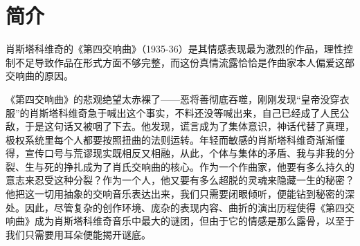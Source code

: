 \documentclass[a4paper,left=2.5cm,right=2.5cm,11pt]{article}
\begin{document}
\tableofcontents

\clearpage

\section{简介}
	肖斯塔科维奇的《第四交响曲》（1935-36）是其情感表现最为激烈的作品，理性控制不足导致作品在形式方面不够完整，而这份真情流露恰恰是作曲家本人偏爱这部交响曲的原因。\par

	《第四交响曲》的悲观绝望太赤裸了——恶将善彻底吞噬，刚刚发现“皇帝没穿衣服”的肖斯塔科维奇急于喊出这个事实，不料还没等喊出来，自己已经成了人民公敌，于是这句话又被咽了下去。他发现，谎言成为了集体意识，神话代替了真理，极权系统里每个人都要按照扭曲的法则运转。年轻而敏感的肖斯塔科维奇渐渐懂得，宣传口号与荒谬现实既相反又相融，从此，个体与集体的矛盾、我与非我的分裂、生与死的挣扎成为了肖氏交响曲的核心。作为一个作曲家，他要有多么持久的意志来忍受这种分裂？作为一个人，他又要有多么超脱的灵魂来隐藏一生的秘密？他把这一切用抽象的交响音乐表达出来，我们只需要闭眼倾听，便能钻到秘密的深处。因此，尽管复杂的创作环境、庞杂的表现内容、曲折的演出历程使得《第四交响曲》成为肖斯塔科维奇音乐中最大的谜团，但由于它的情感是那么露骨，以至于我们只需要用耳朵便能揭开谜底。


\end{document}
